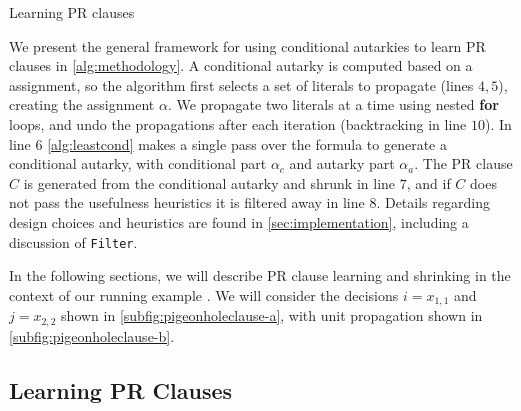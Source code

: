 \begin{algorithm}\caption{Learning PR clauses}\label{alg:methodology}
    \SetAlgoNoLine {}
     
     
     
      
\end{algorithm}

We present the general framework for using conditional autarkies to learn PR
clauses in \autoref{alg:methodology}. A conditional autarky is computed based on
a assignment, so the algorithm first selects a set of literals to propagate
(lines $4,5$), creating the assignment $\alpha$. We propagate two literals at a
time using nested \textbf{for} loops, and undo the propagations after each
iteration (backtracking in line $10$). In line $6$ \autoref{alg:leastcond}
makes a single pass over the formula to generate a conditional autarky, with
conditional part $\alpha_c$ and autarky part $\alpha_a$. The PR clause $C$
is generated from the conditional autarky and shrunk in line $7$, and if $C$
does not pass the usefulness heuristics it is filtered away in line $8$. Details
regarding design choices and heuristics are found in
\autoref{sec:implementation}, including a discussion of \texttt{Filter}.

In the following sections, we will describe PR clause learning and shrinking in
the context of our running example  . We will consider the decisions $i =
x_{1, 1}$ and $j = x_{2, 2}$ shown in \autoref{subfig:pigeonholeclause-a}, with
unit propagation shown in \autoref{subfig:pigeonholeclause-b}.

\subsection{Learning PR Clauses}~\label{subsec:learning}


